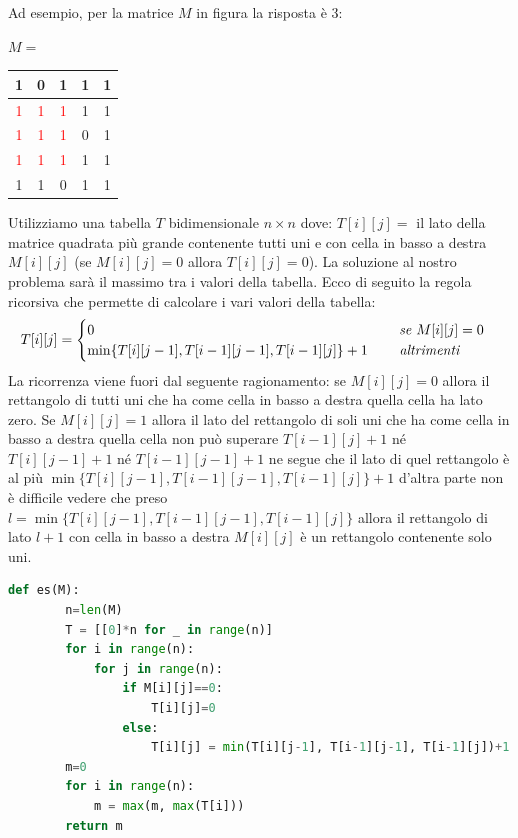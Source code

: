 Ad esempio, per la matrice $M$ in figura la risposta è 3:
\begin{center}$M=$
\begin{tabular}{|c|c|c|c|c|}
     \hline 1&0&1&1&1\\\hline
     \textcolor{red}{1}&\textcolor{red}{1}&\textcolor{red}{1}&1&1\\\hline
     \textcolor{red}{1}&\textcolor{red}{1}&\textcolor{red}{1}&0&1\\\hline
     \textcolor{red}{1}&\textcolor{red}{1}&\textcolor{red}{1}&1&1\\\hline
     1&1&0&1&1\\\hline
\end{tabular}
\end{center}
Utilizziamo una tabella $T$ bidimensionale $n\times n$ dove: $T[i][j] =$ il lato della matrice quadrata più grande contenente tutti uni e con cella in basso a destra $M[i][j]$ (se $M[i][j]=0$ allora $T[i][j]=0$). La soluzione al nostro problema sarà il massimo tra i valori della tabella. Ecco di seguito la regola ricorsiva che permette di calcolare i vari valori della tabella:
\begin{equation*}T[i][j]=
\begin{cases}
    0\hspace{7.7cm}\textit{se }M[i][j]=0\\
    \min\{T[i][j - 1], T[i - 1][j - 1], T[i - 1][j]\}+1\hspace{.8cm}\textit{altrimenti}
\end{cases}
\end{equation*}
La ricorrenza viene fuori dal seguente ragionamento: se $M[i][j] = 0$ allora il rettangolo di tutti uni che ha come cella in basso a destra quella cella ha lato zero. Se $M[i][j] = 1$ allora il lato del rettangolo di soli uni che ha come cella in basso a destra quella cella non può superare $T[i-1][j] + 1$ né $T[i][j - 1] + 1$ né $T[i - 1][j - 1] + 1$ ne segue che il lato di quel rettangolo è al più $\min\{T[i][j - 1], T[i - 1][j - 1], T[i - 1][j]\} + 1$ d'altra parte non è difficile vedere che preso $l=\min\{T[i][j - 1], T[i - 1][j - 1] ,T[i-1][j]\}$ allora il rettangolo di lato $l+1$ con cella in basso a destra $M[i][j]$ è un rettangolo contenente solo uni.
\begin{lstlisting}[language=Python]
    def es(M):
        n=len(M)
        T = [[0]*n for _ in range(n)]
        for i in range(n):
            for j in range(n):
                if M[i][j]==0:
                    T[i][j]=0
                else:
                    T[i][j] = min(T[i][j-1], T[i-1][j-1], T[i-1][j])+1
        m=0
        for i in range(n):
            m = max(m, max(T[i]))
        return m
\end{lstlisting}


